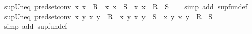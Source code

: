 \begin{isabellebody}
\endisatagproof
{\isafoldproof}%
%
\isadelimproof
\isanewline
%
\endisadelimproof
\isanewline
{}\isamarkupfalse%
\ sup{\isacharunderscore}{\kern0pt}Un{\isacharunderscore}{\kern0pt}eq\ {\isacharbrackleft}{\kern0pt}pred{\isacharunderscore}{\kern0pt}set{\isacharunderscore}{\kern0pt}conv{\isacharbrackright}{\kern0pt}{\isacharcolon}{\kern0pt}\ {\isachardoublequoteopen}{\isacharparenleft}{\kern0pt}{\isasymlambda}x{\isachardot}{\kern0pt}\ x\ {\isasymin}\ R{\isacharparenright}{\kern0pt}\ {\isasymsqunion}\ {\isacharparenleft}{\kern0pt}{\isasymlambda}x{\isachardot}{\kern0pt}\ x\ {\isasymin}\ S{\isacharparenright}{\kern0pt}\ {\isacharequal}{\kern0pt}\ {\isacharparenleft}{\kern0pt}{\isasymlambda}x{\isachardot}{\kern0pt}\ x\ {\isasymin}\ R\ {\isasymunion}\ S{\isacharparenright}{\kern0pt}{\isachardoublequoteclose}\isanewline
%
\isadelimproof
\ \ %
\endisadelimproof
%
\isatagproof
{}\isamarkupfalse%
\ {\isacharparenleft}{\kern0pt}simp\ add{\isacharcolon}{\kern0pt}\ sup{\isacharunderscore}{\kern0pt}fun{\isacharunderscore}{\kern0pt}def{\isacharparenright}{\kern0pt}%
\endisatagproof
{\isafoldproof}%
%
\isadelimproof
\isanewline
%
\endisadelimproof
\isanewline
{}\isamarkupfalse%
\ sup{\isacharunderscore}{\kern0pt}Un{\isacharunderscore}{\kern0pt}eq{}\ {\isacharbrackleft}{\kern0pt}pred{\isacharunderscore}{\kern0pt}set{\isacharunderscore}{\kern0pt}conv{\isacharbrackright}{\kern0pt}{\isacharcolon}{\kern0pt}\ {\isachardoublequoteopen}{\isacharparenleft}{\kern0pt}{\isasymlambda}x\ y{\isachardot}{\kern0pt}\ {\isacharparenleft}{\kern0pt}x{\isacharcomma}{\kern0pt}\ y{\isacharparenright}{\kern0pt}\ {\isasymin}\ R{\isacharparenright}{\kern0pt}\ {\isasymsqunion}\ {\isacharparenleft}{\kern0pt}{\isasymlambda}x\ y{\isachardot}{\kern0pt}\ {\isacharparenleft}{\kern0pt}x{\isacharcomma}{\kern0pt}\ y{\isacharparenright}{\kern0pt}\ {\isasymin}\ S{\isacharparenright}{\kern0pt}\ {\isacharequal}{\kern0pt}\ {\isacharparenleft}{\kern0pt}{\isasymlambda}x\ y{\isachardot}{\kern0pt}\ {\isacharparenleft}{\kern0pt}x{\isacharcomma}{\kern0pt}\ y{\isacharparenright}{\kern0pt}\ {\isasymin}\ R\ {\isasymunion}\ S{\isacharparenright}{\kern0pt}{\isachardoublequoteclose}\isanewline
%
\isadelimproof
\ \ %
\endisadelimproof
%
\isatagproof
{}\isamarkupfalse%
\ {\isacharparenleft}{\kern0pt}simp\ add{\isacharcolon}{\kern0pt}\ sup{\isacharunderscore}{\kern0pt}fun{\isacharunderscore}{\kern0pt}def{\isacharparenright}{\kern0pt}%
\endisatagproof
{\isafoldproof}%
%
\isadelimproof
\isanewline
%
\endisadelimproof
\isanewline
{}\isamarkupfalse%

\end{isabellebody}
